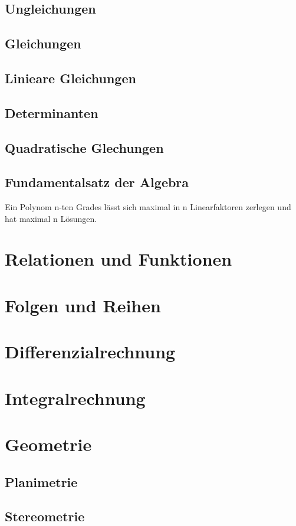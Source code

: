 \documentclass[12pt,a4paper,fleqn,twoside,pdf,final]{article}
\begin{document}
\subsection{Ungleichungen}
\subsection{Gleichungen}
\subsection{Linieare Gleichungen}
\subsection{Determinanten}
\subsection{Quadratische Glechungen}
\subsection{Fundamentalsatz der Algebra}
Ein Polynom n-ten Grades lässt sich maximal in n Linearfaktoren zerlegen und hat maximal n Lösungen.

\section{Relationen und Funktionen}
\section{Folgen und Reihen}
\section{Differenzialrechnung}
\section{Integralrechnung}
\section{Geometrie}



\subsection{Planimetrie}
\subsection{Stereometrie}
\end{document}
